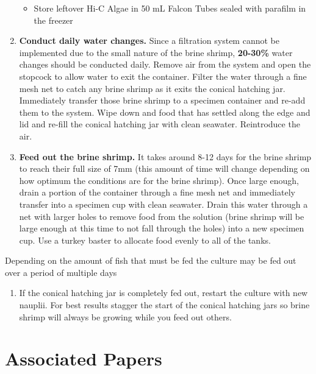 \documentclass[
  letterpaper,
  DIV=11,
  numbers=noendperiod]{scrreprt}
\providecommand{\tightlist}{%
  \setlength{\itemsep}{0pt}\setlength{\parskip}{0pt}}\usepackage{longtable,booktabs,array}
\begin{document}
\begin{enumerate}
  \begin{itemize}
  \tightlist
  \item
    Store leftover Hi-C Algae in 50 mL Falcon Tubes sealed with parafilm
    in the freezer
  \end{itemize}
\item
  \textbf{Conduct daily water changes.} Since a filtration system cannot
  be implemented due to the small nature of the brine shrimp,
  \textbf{20-30\%} water changes should be conducted daily. Remove air
  from the system and open the stopcock to allow water to exit the
  container. Filter the water through a fine mesh net to catch any brine
  shrimp as it exits the conical hatching jar. Immediately transfer
  those brine shrimp to a specimen container and re-add them to the
  system. Wipe down and food that has settled along the edge and lid and
  re-fill the conical hatching jar with clean seawater. Reintroduce the
  air.
\item
  \textbf{Feed out the brine shrimp.} It takes around 8-12 days for the
  brine shrimp to reach their full size of 7mm (this amount of time will
  change depending on how optimum the conditions are for the brine
  shrimp). Once large enough, drain a portion of the container through a
  fine mesh net and immediately transfer into a specimen cup with clean
  seawater. Drain this water through a net with larger holes to remove
  food from the solution (brine shrimp will be large enough at this time
  to not fall through the holes) into a new specimen cup. Use a turkey
  baster to allocate food evenly to all of the tanks.
\end{enumerate}

Depending on the amount of fish that must be fed the culture may be fed
out over a period of multiple days

\begin{enumerate}
\def\labelenumi{\arabic{enumi}.}
\setcounter{enumi}{6}
\tightlist
\item
  If the conical hatching jar is completely fed out, restart the culture
  with new nauplii. For best results stagger the start of the conical
  hatching jars so brine shrimp will always be growing while you feed
  out others.
\end{enumerate}

\hypertarget{associated-papers-3}{%
\section{Associated Papers}\label{associated-papers-3}}
\end{document}
